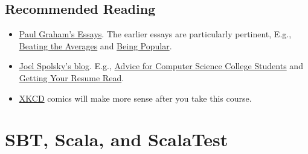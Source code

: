\documentclass{book}
\begin{document}
\subsection{Recommended Reading}

\begin{itemize}

  \item \href{http://paulgraham.com/articles.html}{Paul Graham's Essays}.
  The earlier essays are particularly pertinent, E.g.,
  \href{http://paulgraham.com/avg.html}{Beating the Averages} and
  \href{http://paulgraham.com/popular.html}{Being Popular}.

  \item \href{http://www.joelonsoftware.com}{Joel Spolsky's blog}. E.g.,
  \href{http://www.joelonsoftware.com/articles/CollegeAdvice.html}
  {Advice for Computer Science College Students}
  and \href{http://www.joelonsoftware.com/articles/ResumeRead.html}
  {Getting Your Resume Read}.

  \item \href{http://xkcd.com}{XKCD} comics will make more sense after you take
  this course.

\end{itemize}


\section{SBT, Scala, and ScalaTest}
\end{document}
